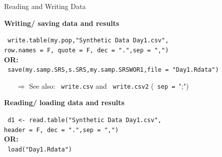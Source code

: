 \documentclass[11pt,german,hideothersubsections]{beamer}
\newcommand{\R}[1]{{\tt \color{blue}  #1}}
\begin{document}
\begin{frame}[fragile]{Reading and Writing Data}
\footnotesize{
\begin{center}
\textbf{Writing/ saving data and results}\\
\end{center}
\R{write.table(my.pop,"Synthetic Data Day1.csv",\\
            row.names = F, quote = F, dec = ".",sep = ",")}\\ 
            \textbf{OR:}\\
\R{save(my.samp.SRS,s.SRS,my.samp.SRSWOR1,file = "Day1.Rdata")}\\
\begin{itemize}
\item[$\Rightarrow$] See also: \R{write.csv} and \R{write.csv2} (\R{sep = }";")
\end{itemize}
\begin{center}
\textbf{Reading/ loading data and results}\\
\end{center}
\R{d1 <- read.table("Synthetic Data Day1.csv",\\
            header = F, dec = ".",sep = ",")}\\
            \textbf{OR:}\\
\R{load("Day1.Rdata")}}

\end{frame}
\end{document}
